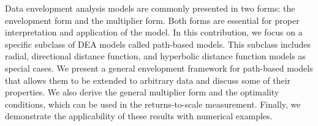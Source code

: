 
\begin{Abstrakt}
    Data envelopment analysis models are commonly presented in two forms: the envelopment form and the multiplier form. Both forms are essential for proper interpretation and application of the model. In this contribution, we focus on a specific subclass of DEA models called path-based models. This subclass includes radial, directional distance function, and hyperbolic distance function models as special cases. We present a general envelopment framework for path-based models that allows them to be extended to arbitrary data and discuss some of their properties. We also derive the general multiplier form and the optimality conditions, which can be used in the returns-to-scale measurement. Finally, we demonstrate the applicability of these results with numerical examples.
\end{Abstrakt}



\clearpage